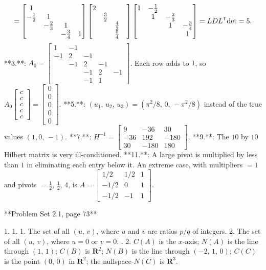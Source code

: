 \[=\begin{bmatrix}1&&&\\ -\frac{1}{2}&1&&\\ &-\frac{2}{3}&1&\\ &&-\frac{3}{4}&1\end{bmatrix}\begin{bmatrix}2&&&\\ &\frac{3}{2}&&\\ &&\frac{4}{3}&\\ &&\frac{5}{4}\end{bmatrix}\begin{bmatrix}1&-\frac{1}{2}&&\\ &1&-\frac{2}{3}&\\ &&1&-\frac{3}{4}\\ &&&1\end{bmatrix}=LDL^{\mathsf{T}}\\ \text{det}=5.\]
**3.**: \(A_{0}=\begin{bmatrix}1&-1&&\\ -1&2&-1&\\ &-1&2&-1\\ &&-1&2&-1\\ &&-1&1\end{bmatrix}\). Each row adds to \(1\), so \(A_{0}\begin{bmatrix}c\\ c\\ c\\ c\\ c\end{bmatrix}=\begin{bmatrix}0\\ 0\\ 0\\ 0\\ 0\end{bmatrix}\).
**5.**: \((u_{1},\,u_{2},\,u_{3})=(\pi^{2}/8,\,0,\,-\pi^{2}/8)\) instead of the true values \((1,0,\,-1)\).
**7.**: \(H^{-1}=\begin{bmatrix}9&-36&30\\ -36&192&-180\\ 30&-180&180\end{bmatrix}\).
**9.**: The \(10\) by \(10\) Hilbert matrix is very ill-conditioned.
**11.**: A large pivot is multiplied by less than \(1\) in eliminating each entry below it. An extreme case, with multipliers \(=1\) and pivots \(=\frac{1}{2}\), \(\frac{1}{2}\), \(4\), is \(A=\begin{bmatrix}1/2&1/2&1\\ -1/2&0&1\\ -1/2&-1&1\end{bmatrix}\).

**Problem Set 2.1, page 73**

1. 1. 1. The set of all \((u,\,v)\), where \(u\) and \(v\) are ratios \(p/q\) of integers. 2. The set of all \((u,\,v)\), where \(u=0\) or \(v=0\). .
2. \(C(A)\) is the \(x\)-axis; \(N(A)\) is the line through \((1,\,1)\); \(C(B)\) is \(\mathbf{R}^{2}\); \(N(B)\) is the line through \((-2,\,1,\,0)\); \(C(C)\) is the point \((0,\,0)\) in \(\mathbf{R}^{2}\); the nullspace-\(N(C)\) is \(\mathbf{R}^{3}\).

